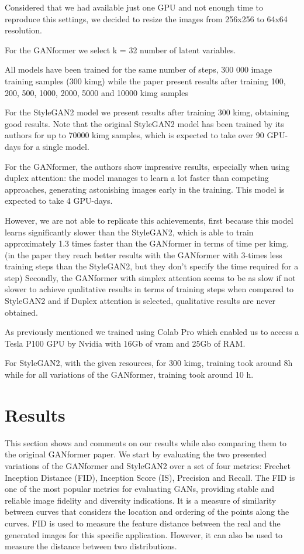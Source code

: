 \documentclass{article}
\begin{document}
	Considered that we had available just one GPU and not enough time to reproduce this settings, we 
	decided to resize the images from 256x256 to 64x64 resolution.
	
	
	For the GANformer we select k = 32 number of latent variables. 
	
	All models have been trained for the same number of steps, 300 000 image
	training samples (300 kimg) while the paper present results after training 100, 200, 500, 1000, 2000, 
	5000 and 10000 kimg samples
	
	For the StyleGAN2 model we present results after training 300 kimg, obtaining 
	good results.
	Note that the original StyleGAN2 model has been trained by its authors \cite{karras2020analyzing} 
	for up to 70000 kimg samples, which is expected to take over 90 GPU-days for a single model. 
	
	
	For the GANformer, the authors \cite{karras2020analyzing} show impressive results, especially when 
	using duplex attention: the model manages to learn a lot faster than competing approaches, 
	generating astonishing images early in the training. This model is expected to take 4 GPU-days.
	
	However, we are not able to replicate this achievements, first because this model learns significantly 
	slower than the StyleGAN2, which is able to train approximately 
	1.3 times faster than the GANformer in terms of time per kimg.
	(in the paper they reach better results with the GANformer with 3-times less training steps than the 
	StyleGAN2, but they don't specify the time required for a step)
	Secondly, the GANformer with simplex attention seems to be as slow if not slower to achieve 
	qualitative results
	in terms of training steps when compared to StyleGAN2 and if Duplex attention is selected, 
	qualitative results are never obtained.
	
	As previously mentioned we trained using Colab Pro which enabled us to access a Tesla P100 GPU 
	by Nvidia with 16Gb of vram 
	and 25Gb of RAM.
	
	For StyleGAN2, with the given resources, for 300 kimg, training took around 8h while for all 
	variations of the GANformer, training took around 10 h.
	
	
	\section{Results}\label{sec:results}
	This section shows and comments on our results while also comparing them to the original GANformer 
	paper. We start by evaluating the two presented variations of the GANformer and StyleGAN2 over a set 
	of four metrics: Frechet Inception Distance (FID), Inception Score (IS), Precision and Recall. The FID 
	is one of the most popular metrics for evaluating GANs, providing stable and reliable image fidelity and 
	diversity indications. It is a measure of similarity between curves that considers the location and ordering 
	of the points along the curves. FID is used to measure the feature distance between the real and the generated 
	images for this specific application. However, it can also be used to measure the distance between two distributions.
	
\end{document}
